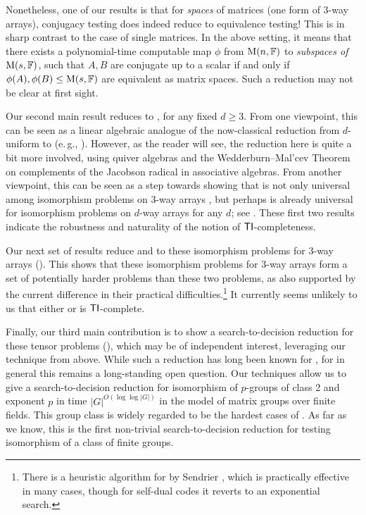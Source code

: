 Nonetheless, one of our results is that for \emph{spaces} of matrices (one form of 3-way arrays), conjugacy testing does indeed reduce to equivalence testing!
This is in sharp contrast to the case of single matrices. In 
the above setting, it means that there exists a polynomial-time computable map 
$\phi$ from $\mathrm{M}(n, \mathbb{F})$ to \emph{subspaces of} $\mathrm{M}(s, \mathbb{F})$, such that $A, B$ are 
conjugate up to a scalar if and only if $\phi(A), \phi(B)\leq \mathrm{M}(s, \mathbb{F})$ are 
equivalent as matrix spaces. Such a reduction may not be clear 
at first sight.

Our second main result reduces \DeeTI to \ThreeTI, for any fixed $d \geq 3$. 
From one viewpoint, this can be seen as a linear algebraic analogue of the 
now-classical reduction from $d$-uniform  to \GI (e.\,g., \cite{ZKT}). 
However, as the reader will see, the reduction here is quite a bit more involved, 
using quiver algebras and the Wedderburn--Mal'cev Theorem on complements of the 
Jacobson radical in associative algebras. From another viewpoint, this can be seen 
as a step towards showing that \ThreeTI is not only universal among isomorphism 
problems on 3-way arrays \cite{FGS19}, but perhaps \ThreeTI is already universal 
for isomorphism problems on $d$-way arrays for any $d$; see .
These first two results indicate the robustness and naturality of the notion of 
$\mathsf{TI}$-completeness.

Our next set of results reduce \GIlong and  to these 
isomorphism problems for 3-way arrays (). This 
shows that these isomorphism problems for 3-way arrays form a set of potentially 
harder problems than these two problems, as 
also supported by the current difference in their practical 
difficulties.\footnote{There is a heuristic 
algorithm for  by Sendrier \cite{Sen00}, which 
is practically effective in many cases, 
though for self-dual codes it reverts to an exponential search.}  It currently 
seems unlikely to us that either 
\GIlong or \CodeEqlong is $\mathsf{TI}$-complete. 

Finally, our third main contribution is to 
show a search-to-decision reduction for these 
tensor problems (), which may be of independent interest,  leveraging our technique from above.
While such a reduction has long been known for \GI, for \GpIlong in general this 
remains a long-standing open question. Our techniques allow us to give a  
search-to-decision reduction for isomorphism of $p$-groups of class 2 and exponent $p$ in time 
$|G|^{O(\log \log |G|)}$ in the model of matrix groups over finite fields.
This group class is widely regarded to be the hardest cases of 
\GpIlong. As far as we know, this is the first 
non-trivial search-to-decision reduction for testing isomorphism of a class of finite groups. 

